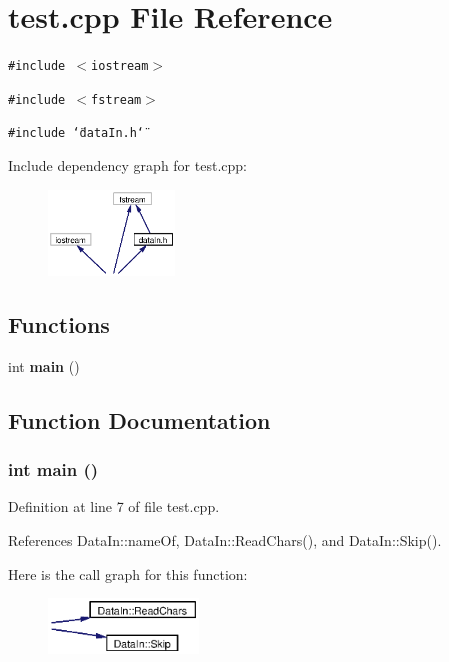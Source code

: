 \section{test.cpp File Reference}
\label{test_8cpp}
{\tt \#include $<$iostream$>$}\par
{\tt \#include $<$fstream$>$}\par
{\tt \#include \char`\"{}data\-In.h\char`\"{}}\par


Include dependency graph for test.cpp:\begin{figure}[H]
\begin{center}
\leavevmode
\includegraphics[width=95pt]{test_8cpp__incl}
\end{center}
\end{figure}
\subsection*{Functions}
\begin{CompactItemize}
\item 
int {\bf main} ()
\end{CompactItemize}


\subsection{Function Documentation}
\subsubsection{\setlength{\rightskip}{0pt plus 5cm}int main ()}\label{test_8cpp_a0}




Definition at line 7 of file test.cpp.

References Data\-In::name\-Of, Data\-In::Read\-Chars(), and Data\-In::Skip().

Here is the call graph for this function:\begin{figure}[H]
\begin{center}
\leavevmode
\includegraphics[width=113pt]{test_8cpp_a0_cgraph}
\end{center}
\end{figure}
